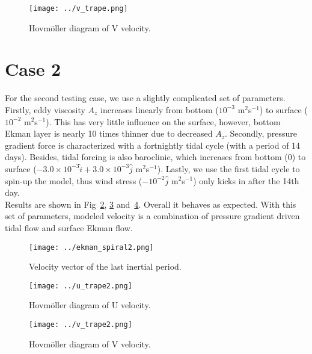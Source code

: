 \documentclass{article}
\begin{document}
\begin{figure}
  \centerline{\texttt{[image: ../v\_trape.png]}}
  \caption{Hovm\"{o}ller diagram of V velocity.}
  \label{fig:v}
\end{figure}

\section{Case 2}
For the second testing case, we use a slightly complicated set of parameters. Firstly, eddy viscosity $A_z$ increases linearly from bottom ($10^{-3}$ m$^2$s$^{-1}$) to surface ($10^{-2}$ m$^2$s$^{-1}$). This has very little influence on the surface, however, bottom Ekman layer is nearly 10 times thinner due to decreased $A_z$. Secondly, pressure gradient force is characterized with a fortnightly tidal cycle (with a period of 14 days). Besides, tidal forcing is also baroclinic, which increases from bottom (0) to surface ($-3.0\times10^{-3}\hat{i}+3.0\times10^{-3}\hat{j}$ m$^2$s$^{-1}$). Lastly, we use the first tidal cycle to spin-up the model, thus wind stress ($-10^{-2}\hat{j}$ m$^2$s$^{-1}$) only kicks in after the 14th day.\\

Results are shown in Fig~\ref{fig:spiral2}, \ref{fig:u2} and~\ref{fig:v2}. Overall it behaves as expected. With this set of parameters, modeled velocity is a combination of pressure gradient driven tidal flow and surface Ekman flow.\\

\begin{figure}
  \centerline{\texttt{[image: ../ekman\_spiral2.png]}}
  \caption{Velocity vector of the last inertial period.}
  \label{fig:spiral2}
\end{figure}

\begin{figure}
  \centerline{\texttt{[image: ../u\_trape2.png]}}
  \caption{Hovm\"{o}ller diagram of U velocity.}
  \label{fig:u2}
\end{figure}

\begin{figure}
  \centerline{\texttt{[image: ../v\_trape2.png]}}
  \caption{Hovm\"{o}ller diagram of V velocity.}
  \label{fig:v2}
\end{figure}



\clearpage


\end{document}
